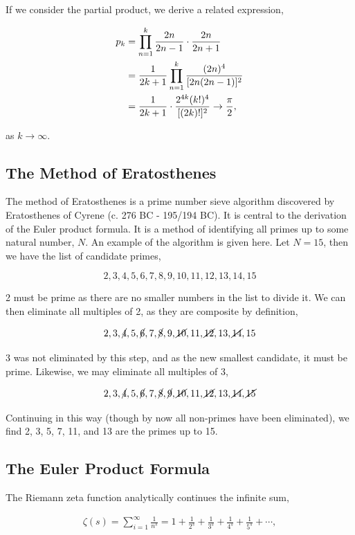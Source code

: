 \documentclass[11pt]{amsart}
\begin{document}
If we consider the partial product, we derive a related expression,

\begin{align}
p_k &= \prod_{n=1}^{k} \frac{2n}{2n - 1} \cdot \frac{2n}{2n + 1} \notag \\
&= \frac{1}{2k + 1} \prod_{n=1}^{k}\frac{(2n)^4}{[2n(2n - 1)]^2} \notag \\
&= \frac{1}{2k + 1} \cdot \frac{2^{4k}(k!)^4}{[(2k)!]^2} \to \frac{\pi}{2}, \notag
\end{align}

as $k \to \infty$.

\subsection{The Method of Eratosthenes}

The method of Eratosthenes is a prime number sieve algorithm discovered by Eratosthenes of Cyrene (c. 276 BC - 195/194 BC). It is central to the derivation of the Euler product formula. It is a method of identifying all primes up to some natural number, $N$. An example of the algorithm is given here. Let $N = 15$, then we have the list of candidate primes,

$$2, 3, 4, 5, 6, 7, 8, 9, 10, 11, 12, 13, 14, 15$$

2 must be prime as there are no smaller numbers in the list to divide it. We can then eliminate all multiples of 2, as they are composite by definition,

$$2, 3, \cancel{4}, 5, \cancel{6}, 7, \cancel{8}, 9, \cancel{10}, 11, \cancel{12}, 13, \cancel{14}, 15$$

3 was not eliminated by this step, and as the new smallest candidate, it must be prime. Likewise, we may eliminate all multiples of 3,

$$2, 3, \cancel{4}, 5, \cancel{6}, 7, \cancel{8}, \cancel{9}, \cancel{10}, 11, \cancel{12}, 13, \cancel{14}, \cancel{15}$$

Continuing in this way (though by now all non-primes have been eliminated), we find 2, 3, 5, 7, 11, and 13 are the primes up to 15.

\subsection{The Euler Product Formula}

The Riemann zeta function analytically continues the infinite sum,

\begin{align}\zeta(s) = \sum_{i=1}^{\infty}\frac{1}{n^s} = 1 + \frac{1}{2^s} + \frac{1}{3^s} + \frac{1}{4^s} + \frac{1}{5^s} + \cdots,\label{eq:zeta}
\end{align}
\end{document}
